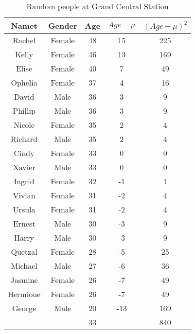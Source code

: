 \documentclass[11pt]{exam}
\begin{document}
\begin{questions}
\ifprintanswers
\begin{table}[ht]
\begin{center}
\begin{tabular}{|c|c|c|c|c|}
  \hline
Namet & Gender & Age & $Age - \mu$ & ${(Age - \mu)}^2$ \\ 
  \hline
Rachel & Female & 48 & 15 & 225 \\ 
   \hline
Kelly & Female & 46 & 13 & 169 \\ 
   \hline
Elise & Female & 40 & 7 & 49 \\ 
   \hline
Ophelia & Female & 37 & 4 & 16 \\ 
   \hline
David & Male & 36 & 3 & 9 \\ 
   \hline
Phillip & Male & 36 & 3 & 9 \\ 
   \hline
Nicole & Female & 35 & 2 & 4 \\ 
   \hline
Richard & Male & 35 & 2 & 4 \\ 
   \hline
Cindy & Female & 33 & 0 & 0 \\ 
   \hline
Xavier & Male & 33 & 0 & 0 \\ 
   \hline
Ingrid & Female & 32 & -1 & 1 \\ 
   \hline
Vivian & Female & 31 & -2 & 4 \\ 
   \hline
Ursula & Female & 31 & -2 & 4 \\ 
   \hline
Ernest & Male & 30 & -3 & 9 \\ 
   \hline
Harry & Male & 30 & -3 & 9 \\ 
   \hline
Quetzal & Female & 28 & -5 & 25 \\ 
   \hline
Michael & Male & 27 & -6 & 36 \\ 
   \hline
Jasmine & Female & 26 & -7 & 49 \\ 
   \hline
Hermione & Female & 26 & -7 & 49 \\ 
   \hline
George & Male & 20 & -13 & 169 \\ 
   \hline
\hline
 &  & 33 &  & 840 \\ 
   \hline
\end{tabular}
\caption{Random people at Grand Central Station}
\label{tab:ages}
\end{center}
\end{table}\else
%
\begin{table}[ht]
\begin{center}
\begin{tabular}{|c|c|c|p{3cm}|p{3cm}|}

\end{tabular}
\end{center}
\end{table}
\end{questions}
\end{document}
